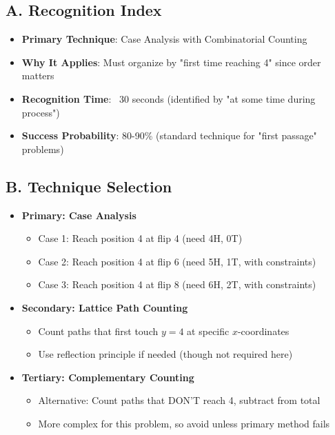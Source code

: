 \documentclass[]{article}
\begin{document}
\begin{techniquesbox}
\subsection*{A. Recognition Index}
\begin{itemize}[leftmargin=*]
    \item \textbf{Primary Technique}: Case Analysis with Combinatorial Counting
    \item \textbf{Why It Applies}: Must organize by "first time reaching 4" since order matters
    \item \textbf{Recognition Time}: ~30 seconds (identified by "at some time during process")
    \item \textbf{Success Probability}: 80-90\% (standard technique for "first passage" problems)
\end{itemize}
\end{techniquesbox}

\subsection*{B. Technique Selection}
\begin{itemize}[leftmargin=*]
    \item \textbf{Primary: Case Analysis}
    \begin{itemize}
        \item Case 1: Reach position 4 at flip 4 (need 4H, 0T)
        \item Case 2: Reach position 4 at flip 6 (need 5H, 1T, with constraints)
        \item Case 3: Reach position 4 at flip 8 (need 6H, 2T, with constraints)
    \end{itemize}
    \item \textbf{Secondary: Lattice Path Counting}
    \begin{itemize}
        \item Count paths that first touch $y=4$ at specific $x$-coordinates
        \item Use reflection principle if needed (though not required here)
    \end{itemize}
    \item \textbf{Tertiary: Complementary Counting}
    \begin{itemize}
        \item Alternative: Count paths that DON'T reach 4, subtract from total
        \item More complex for this problem, so avoid unless primary method fails
    \end{itemize}
\end{itemize}
\end{document}
